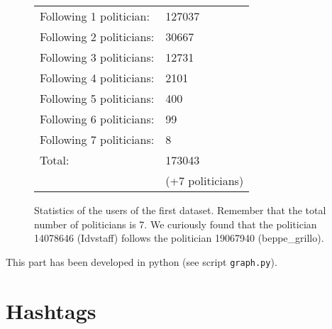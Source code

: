 \documentclass[a4paper,11pt,oneside]{article}
\begin{document}
\begin{figure}[h]
\begin{center}
	\begin{tabular}{l | l}
	Following 1 politician: & 127037\\ %
	Following 2 politicians: & 30667\\ %
	Following 3 politicians: & 12731\\ %
	Following 4 politicians: & 2101\\ %
	Following 5 politicians: & 400\\ %
	Following 6 politicians: & 99\\ %
	Following 7 politicians: & 8\\ \hline
	Total:	 & 173043 \\
	& (+7 politicians)\\ %
	\end{tabular}
\end{center}
\caption{Statistics of the users of the first dataset. Remember that the total number of politicians is 7. We curiously found that the politician 14078646 (Idvstaff) follows the politician 19067940 (beppe\_grillo).}
\end{figure}

This part has been developed in python (see script \texttt{graph.py}).

\section{Hashtags}
\end{document}
